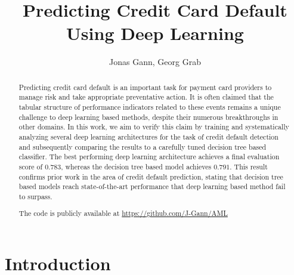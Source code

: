 \documentclass[runningheads]{llncs}
\begin{document}
\title{Predicting Credit Card Default Using Deep Learning}

\author{Jonas Gann, Georg Grab}
%
%
%
\maketitle              %
%
\begin{abstract}

Predicting credit card default is an important task for payment card providers to manage risk and take appropriate preventative action. It is often claimed that the tabular structure of performance indicators related to these events remains a unique challenge to deep learning based methods, despite their numerous breakthroughs in other domains. In this work, we aim to verify this claim by training and systematically analyzing several deep learning architectures for the task of credit default detection and subsequently comparing the results to a carefully tuned decision tree based classifier. The best performing deep learning architecture achieves a final evaluation score of $0.783$, whereas the decision tree based model achieves $0.791$. This result confirms prior work in the area of credit default prediction, stating that decision tree based models reach state-of-the-art performance that deep learning based method fail to surpass.

The code is publicly available at \url{https://github.com/J-Gann/AML}

\end{abstract}
%
%
%


\section{Introduction}
\end{document}
